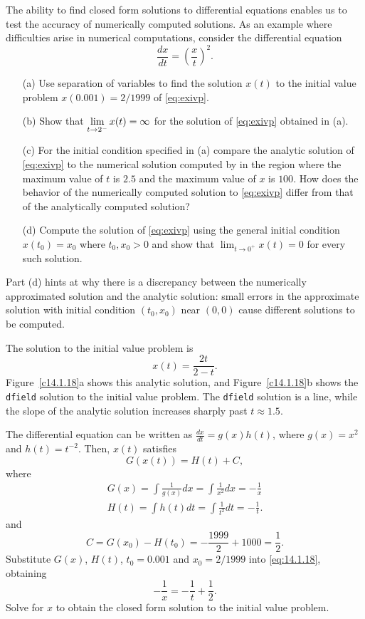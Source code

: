 \documentclass{ximera}
\begin{document}
\begin{computerExercise} \label{c14.1.18}
The ability to find closed form solutions to differential equations enables
us to test the accuracy of numerically computed solutions.  As an example where difficulties arise in numerical computations, consider the differential 
equation
\begin{equation} \label{eq:exivp}
\frac{dx}{dt} = \left(\frac{x}{t}\right)^2.
\end{equation}
\begin{itemize}
\item[(a)] Use separation of variables to find the solution $x(t)$ to the 
initial value problem $x(0.001) = 2/1999$ of \eqref{eq:exivp}.
\item[(b)] Show that $\displaystyle\lim_{t\to 2^-}x(t)=\infty$ for the solution of 
\eqref{eq:exivp} obtained in (a).
\item[(c)] For the initial condition specified in (a) compare the analytic 
solution of \eqref{eq:exivp} to the numerical solution computed by {\dfield} 
in the region where the maximum value of $t$ is $2.5$ and the maximum value of 
$x$ is $100$.  How does the behavior of the numerically computed solution 
to \eqref{eq:exivp} differ from that of the analytically computed solution?
\item[(d)]  Compute the solution of \eqref{eq:exivp} using the general initial 
condition $x(t_0) = x_0$ where $t_0,x_0>0$ and show that 
$\lim_{t\to 0^+}x(t)=0$ for every such solution. 
\end{itemize}
 Part (d) hints at why there is a discrepancy 
between the numerically approximated solution and the analytic solution: 
small errors in the approximate solution with initial condition $(t_0,x_0)$ 
near $(0,0)$ cause different solutions to be computed.

\begin{solution}
\ans The solution to the initial value problem is
\[
x(t) = \frac{2t}{2 - t}.
\]
Figure~\ref{c14.1.18}a shows this analytic solution, and
Figure~\ref{c14.1.18}b shows the {\tt dfield} solution to the initial
value problem.  The {\tt dfield} solution is a line, while the slope
of the analytic solution increases sharply past $t \approx 1.5$.

\soln The differential equation can be written as $\frac{dx}{dt} = g(x)h(t)$,
where $g(x) = x^2$ and $h(t) = t^{-2}$.  Then, $x(t)$ satisfies
\begin{equation} \label{eq:14.1.18}
G(x(t)) = H(t) + C,
\end{equation}
where
\[
\begin{array}{l}
G(x) = \int\frac{1}{g(x)}dx = \int\frac{1}{x^2}dx = -\frac{1}{x} \\
H(t) = \int h(t)dt = \int\frac{1}{t^2}dt = -\frac{1}{t}.
\end{array}
\]
and
\[
C = G(x_0) - H(t_0) = -\frac{1999}{2} + 1000  = \frac{1}{2}.
\]
Substitute $G(x)$, $H(t)$, $t_0 = 0.001$ and $x_0 = 2/1999$ into
\eqref{eq:14.1.18}, obtaining
\[
-\frac{1}{x} = -\frac{1}{t} + \frac{1}{2}.
\]
Solve for $x$ to obtain the closed form solution to the initial value problem.


\end{solution}
\end{computerExercise}
\end{document}
